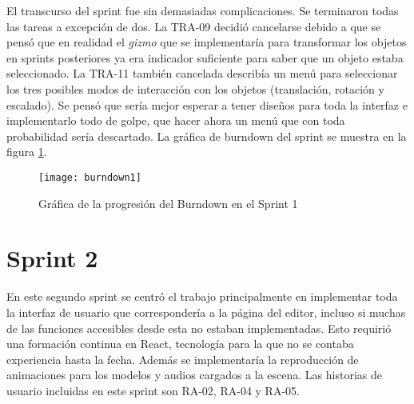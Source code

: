 \begin{table}[H]
\label{TRA-13}
\end{table}

El transcurso del sprint fue sin demasiadas complicaciones. Se terminaron todas las tareas a excepción de dos. La TRA-09 decidió cancelarse debido a que se pensó que en realidad el \textit{gizmo} que se implementaría para transformar los objetos en sprints posteriores ya era indicador suficiente para saber que un objeto estaba seleccionado. La TRA-11 también cancelada describía un menú para seleccionar los tres posibles modos de interacción con los objetos (translación, rotación y escalado). Se pensó que sería mejor esperar a tener diseños para toda la interfaz e implementarlo todo de golpe, que hacer ahora un menú que con toda probabilidad sería descartado. La gráfica de burndown del sprint se muestra en la figura \ref{fig:burndown1}.

\begin{figure}[h]
    \centering
    \texttt{[image: burndown1]}
    \caption[Burndown Sprint 1]{Gráfica de la progresión del Burndown en el Sprint 1}
	\label{fig:burndown1}
\end{figure}

\section{Sprint 2}

En este segundo sprint se centró el trabajo principalmente en implementar toda la interfaz de usuario que correspondería a la página del editor, incluso si muchas de las funciones accesibles desde esta no estaban implementadas. Esto requirió una formación continua en React, tecnología para la que no se contaba experiencia hasta la fecha. Además se implementaría la reproducción de animaciones para los modelos y audios cargados a la escena. Las historias de usuario incluidas en este sprint son RA-02, RA-04 y RA-05.


